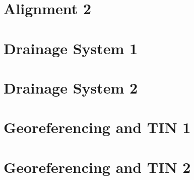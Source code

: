 \documentclass{scrartcl}
\begin{document}
\section{Alignment 2}
\label{sec:alignment_12d_2}
\clearpage



\section{Drainage System 1}
\label{sec:drainage_1}
\clearpage

\section{Drainage System 2}
\label{sec:drainage_2}
\clearpage


\section{Georeferencing and TIN 1}
\label{sec:georef_tin_1}
\clearpage

\section{Georeferencing and TIN 2}
\label{sec:georef_tin_2}
\clearpage
\end{document}
